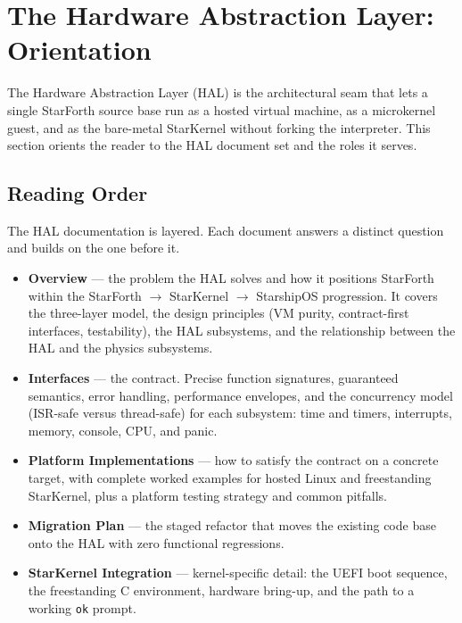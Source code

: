 
\section{The Hardware Abstraction Layer: Orientation}

The Hardware Abstraction Layer (HAL) is the architectural seam that lets a
single StarForth source base run as a hosted virtual machine, as a microkernel
guest, and as the bare-metal StarKernel without forking the interpreter. This
section orients the reader to the HAL document set and the roles it serves.

\subsection{Reading Order}

The HAL documentation is layered. Each document answers a distinct question and
builds on the one before it.

\begin{itemize}
  \item \textbf{Overview} --- the problem the HAL solves and how it positions
        StarForth within the StarForth $\rightarrow$ StarKernel $\rightarrow$
        StarshipOS progression. It covers the three-layer model, the design
        principles (VM purity, contract-first interfaces, testability), the HAL
        subsystems, and the relationship between the HAL and the physics
        subsystems.
  \item \textbf{Interfaces} --- the contract. Precise function signatures,
        guaranteed semantics, error handling, performance envelopes, and the
        concurrency model (ISR-safe versus thread-safe) for each subsystem:
        time and timers, interrupts, memory, console, CPU, and panic.
  \item \textbf{Platform Implementations} --- how to satisfy the contract on a
        concrete target, with complete worked examples for hosted Linux and
        freestanding StarKernel, plus a platform testing strategy and common
        pitfalls.
  \item \textbf{Migration Plan} --- the staged refactor that moves the existing
        code base onto the HAL with zero functional regressions.
  \item \textbf{StarKernel Integration} --- kernel-specific detail: the UEFI
        boot sequence, the freestanding C environment, hardware bring-up, and
        the path to a working \texttt{ok} prompt.
\end{itemize}


